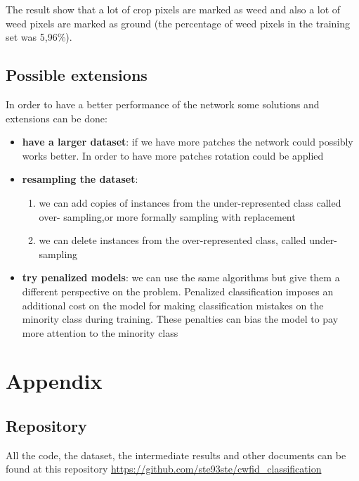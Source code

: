 \documentclass[]{report}
\begin{document}
The result show that a lot of crop pixels are marked as weed and also a lot of weed pixels are marked as ground (the percentage of weed pixels in the training set was 5,96\%).

\section{Possible extensions}

In order to have a better performance of the network some solutions and extensions can be done:

\begin{itemize}

	\item \textbf{have a larger dataset}: if we have more patches the network could possibly works 			          better. In order to have more patches rotation could be applied
	
	\item \textbf{resampling the dataset}: 
   \begin{enumerate}
   
		\item we can add copies of instances from the under-represented class called over-		              sampling,or more formally sampling with replacement
		\item we can delete instances from the over-represented class, called under-sampling
   
   \end{enumerate}
   
   \item \textbf{try penalized models}: we can use the same algorithms but give them a different perspective on the problem.
Penalized classification imposes an additional cost on the model for making classification mistakes on the minority class during training. These penalties can bias the model to pay more attention to the minority class 

\end{itemize}

\chapter{Appendix}

\section{Repository}

All the code, the dataset, the intermediate results and other documents can be found at this repository \url{https://github.com/ste93ste/cwfid_classification}
\end{document}
